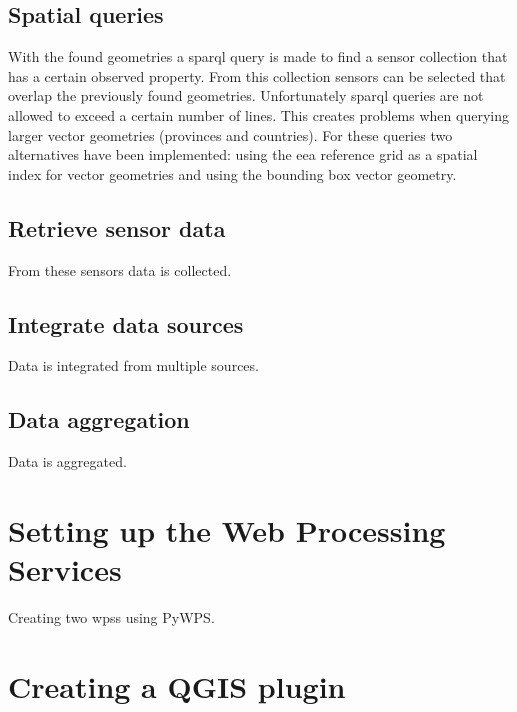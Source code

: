 \subsection{Spatial queries}
With the found geometries a \ac{sparql} query is made to find a sensor collection that has a certain observed property. From this collection sensors can be selected that overlap the previously found geometries. Unfortunately \ac{sparql} queries are not allowed to exceed a certain number of lines. This creates problems when querying larger vector geometries (provinces and countries). For these queries two alternatives have been implemented: using the \ac{eea} reference grid as a spatial index for vector geometries and using the bounding box vector geometry. \\

\subsection{Retrieve sensor data}
From these sensors data is collected. \\

\subsection{Integrate data sources}
Data is integrated from multiple sources.\\

\subsection{Data aggregation}
Data is aggregated.

\section{Setting up the Web Processing Services}
Creating two \aclp{wps} using PyWPS.

\section{Creating a QGIS plugin}
